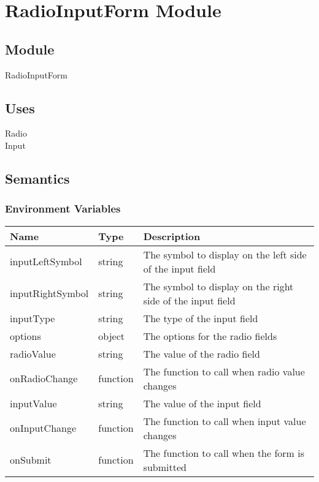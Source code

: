 \documentclass[12pt]{article}
\begin{document}
\newpage


\section{RadioInputForm Module}

\subsection{Module}
RadioInputForm

\subsection{Uses}
Radio \\
Input \\

\subsection{Semantics}

\subsubsection{Environment Variables}
\begin{tabular}{| l | l | p{10cm} |}
    \hline
    \textbf{Name} & \textbf{Type} & \textbf{Description}\\ \hline
    inputLeftSymbol & string & The symbol to display on the left side of the input field\\ \hline
    inputRightSymbol & string & The symbol to display on the right side of the input field\\ \hline
    inputType & string & The type of the input field\\ \hline
    options & object & The options for the radio fields\\ \hline
    radioValue & string & The value of the radio field\\ \hline
    onRadioChange & function & The function to call when radio value changes\\ \hline
    inputValue & string & The value of the input field\\ \hline
    onInputChange & function & The function to call when input value changes\\ \hline
    onSubmit & function & The function to call when the form is submitted\\ \hline
\end{tabular}
\end{document}
